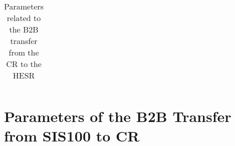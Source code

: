 \begin{longtable}{ | c | c | c | c | c | c |}
\caption{Parameters related to the B2B transfer from the CR to the HESR}
\label{CRtoHESR}
    \end{longtable}
 
 

\newpage
\section{Parameters of the B2B Transfer from SIS100 to CR}
\label{100toCR}

